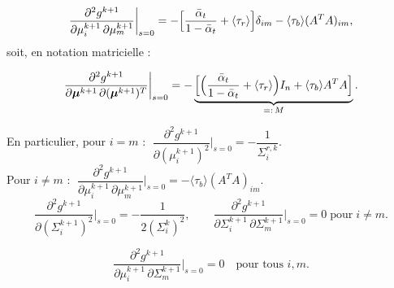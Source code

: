 \documentclass[12pt]{article}
\newcommand{\alt}{\bar\alpha_t}
\begin{document}
\begin{propositionbox}
\label{prop:dg_order2}
\begin{equation}
\frac{\partial^2 g^{k+1}}{\partial \mu_i^{k+1}\,\partial \mu_m^{k+1}}\bigg|_{s=0} = -\Bigl[\frac{\alt}{1-\alt} + \langle\tau_r\rangle\Bigr]\delta_{im} - \langle\tau_b\rangle(A^TA)_{im},
\label{eq:d2g_dmudmu}
\end{equation}
soit, en notation matricielle :

\begin{equation}
\frac{\partial^2 g^{k+1}}{\partial\boldsymbol{\mu}^{k+1}\,\partial(\boldsymbol{\mu}^{k+1})^T}\bigg|_{s=0} = -\underbrace{\Bigl[\Bigl(\frac{\alt}{1-\alt} + \langle\tau_r\rangle\Bigr)I_n + \langle\tau_b\rangle A^TA\Bigr]}_{=:\,M}.
\label{eq:d2g_dmudmu_mat}
\end{equation}

En particulier, pour $i = m$ : $\;\dfrac{\partial^2 g^{k+1}}{\partial(\mu_i^{k+1})^2}\bigg|_{s=0} = -\dfrac{1}{\Sigma_i^{r,k}}$. \\

Pour $i \neq m$ : $\;\dfrac{\partial^2 g^{k+1}}{\partial\mu_i^{k+1}\,\partial\mu_m^{k+1}}\bigg|_{s=0} = -\langle\tau_b\rangle(A^TA)_{im}$.\\


\begin{equation}
\frac{\partial^2 g^{k+1}}{\partial(\Sigma_i^{k+1})^2}\bigg|_{s=0} = -\frac{1}{2(\Sigma_i^k)^2}, \qquad \frac{\partial^2 g^{k+1}}{\partial\Sigma_i^{k+1}\,\partial\Sigma_m^{k+1}}\bigg|_{s=0} = 0 \;\text{pour}\; i \neq m.
\label{eq:d2g_dSigma2}
\end{equation}

\begin{equation}
\frac{\partial^2 g^{k+1}}{\partial\mu_i^{k+1}\,\partial\Sigma_m^{k+1}}\bigg|_{s=0} = 0 \quad \text{pour tous } i, m.
\label{eq:d2g_dmuSigma}
\end{equation}
\end{propositionbox}
\end{document}
